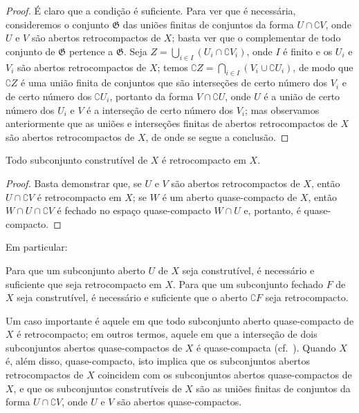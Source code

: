 \begin{proof}
É claro que a condição é suficiente.
Para ver que é necessária, consideremos o conjunto $\mathfrak{G}$ das uniões finitas de conjuntos da forma $U\cap\complement{V}$, onde $U$ e $V$ são abertos retrocompactos de $X$; basta ver que o complementar de todo conjunto de $\mathfrak{G}$ pertence a $\mathfrak{G}$.
Seja $Z=\bigcup_{i\in I}(U_i\cap\complement{V_i})$, onde $I$ é finito e os $U_i$ e $V_i$ são abertos retrocompactos de $X$; temos
$\complement{Z}=\bigcap_{i\in I}(V_i\cup\complement{U_i})$, de modo que $\complement{Z}$ é uma união finita de conjuntos que são interseções de certo número dos $V_i$ e de certo número dos $\complement{U_i}$, portanto da forma
$V\cap\complement{U}$, onde $U$ é a união de certo número dos $U_i$ e $V$ é a interseção de certo número dos $V_i$; mas observamos anteriormente que as uniões e interseções finitas de abertos retrocompactos de $X$ são abertos retrocompactos de $X$, de onde se segue a conclusão.
\end{proof}

\begin{corollary}[9.1.4]
\label{0.9.1.4}
Todo subconjunto construtível de $X$ é retrocompacto em $X$.
\end{corollary}

\begin{proof}
Basta demonstrar que, se $U$ e $V$ são abertos retrocompactos de $X$, então $U\cap\complement{V}$ é retrocompacto em $X$; se $W$ é um aberto quase-compacto de $X$, então $W\cap U\cap\complement{V}$ é fechado no espaço quase-compacto $W\cap U$ e, portanto, é quase-compacto.
\end{proof}

Em particular:
\begin{corollary}[9.1.5]
\label{0.9.1.5}
Para que um subconjunto aberto $U$ de $X$ seja construtível, é necessário e suficiente que seja retrocompacto em $X$.
Para que um subconjunto fechado $F$ de $X$ seja construtível, é necessário e suficiente que o aberto $\complement{F}$ seja retrocompacto.
\end{corollary}

\begin{env}[9.1.6]
\label{0.9.1.6}
Um caso importante é aquele em que todo subconjunto aberto quase-compacto de $X$ é retrocompacto; em outros termos, aquele em que a interseção de dois subconjuntos abertos quase-compactos de $X$ é quase-compacta (cf.~).
Quando $X$ é, além disso, quase-compacto, isto implica que os subconjuntos abertos retrocompactos de $X$ coincidem com os subconjuntos abertos quase-compactos de $X$, e que os subconjuntos construtíveis de $X$ são as uniões finitas de conjuntos da forma $U\cap\complement{V}$, onde $U$ e $V$ são abertos quase-compactos.
\end{env}


